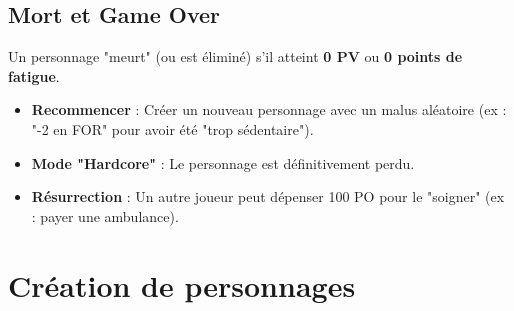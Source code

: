 \documentclass[11pt, a4paper]{article}
\begin{document}
\subsection{Mort et Game Over}
Un personnage "meurt" (ou est éliminé) s'il atteint \textbf{0 PV} ou \textbf{0 points de fatigue}.
\begin{itemize}
    \item \textbf{Recommencer} : Créer un nouveau personnage avec un malus aléatoire (ex : "-2 en FOR" pour avoir été "trop sédentaire").
    \item \textbf{Mode "Hardcore"} : Le personnage est définitivement perdu.
    \item \textbf{Résurrection} : Un autre joueur peut dépenser 100 PO pour le "soigner" (ex : payer une ambulance).
\end{itemize}

\newpage
\section{Création de personnages}
\end{document}
